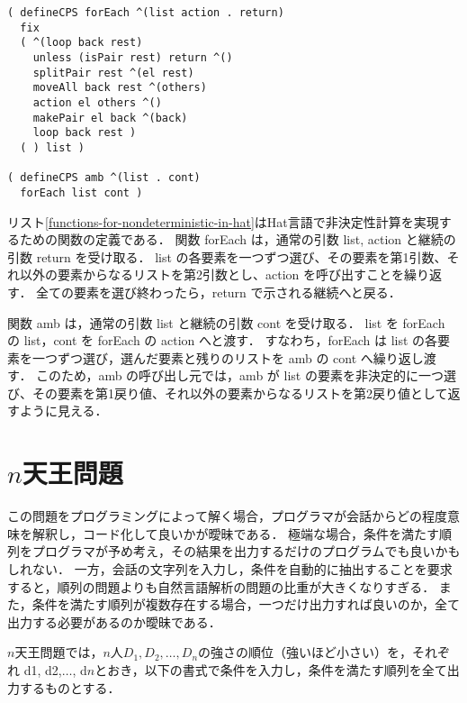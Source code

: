 \documentclass[10pt,a4j,twocolumn,oneside]{jsarticle}
\begin{document}

\begin{table}[tb]
\begin{lstlisting}[caption=Hat言語における非決定性計算のための関数定義,label=functions-for-nondeterministic-in-hat,frame=single,xleftmargin=3mm,xrightmargin=0mm]
( defineCPS forEach ^(list action . return)
  fix
  ( ^(loop back rest)
    unless (isPair rest) return ^()
    splitPair rest ^(el rest)
    moveAll back rest ^(others)
    action el others ^()
    makePair el back ^(back)
    loop back rest )
  ( ) list )

( defineCPS amb ^(list . cont)
  forEach list cont )
\end{lstlisting}
\end{table}

リスト\ref{functions-for-nondeterministic-in-hat}はHat言語で非決定性計算を実現するための関数の定義である．
関数 forEach は，通常の引数 list, action と継続の引数 return を受け取る．
list の各要素を一つずつ選び、その要素を第1引数、それ以外の要素からなるリストを第2引数とし、action を呼び出すことを繰り返す．
全ての要素を選び終わったら，return で示される継続へと戻る．

関数 amb は，通常の引数 list と継続の引数 cont を受け取る．
list を forEach の list，cont を forEach の action へと渡す．
すなわち，forEach は list の各要素を一つずつ選び，選んだ要素と残りのリストを amb の cont へ繰り返し渡す．
このため，amb の呼び出し元では，amb が list の要素を非決定的に一つ選び、その要素を第1戻り値、それ以外の要素からなるリストを第2戻り値として返すように見える．

\section{$n$天王問題}

この問題をプログラミングによって解く場合，プログラマが会話からどの程度意味を解釈し，コード化して良いかが曖昧である．
極端な場合，条件を満たす順列をプログラマが予め考え，その結果を出力するだけのプログラムでも良いかもしれない．
一方，会話の文字列を入力し，条件を自動的に抽出することを要求すると，順列の問題よりも自然言語解析の問題の比重が大きくなりすぎる．
また，条件を満たす順列が複数存在する場合，一つだけ出力すれば良いのか，全て出力する必要があるのか曖昧である．


$n$天王問題では，$n$人$D_1, D_2,\ldots, D_n$の強さの順位（強いほど小さい）を，それぞれ d1, d2,$\ldots$, d$n$とおき，以下の書式で条件を入力し，条件を満たす順列を全て出力するものとする．
\end{document}
